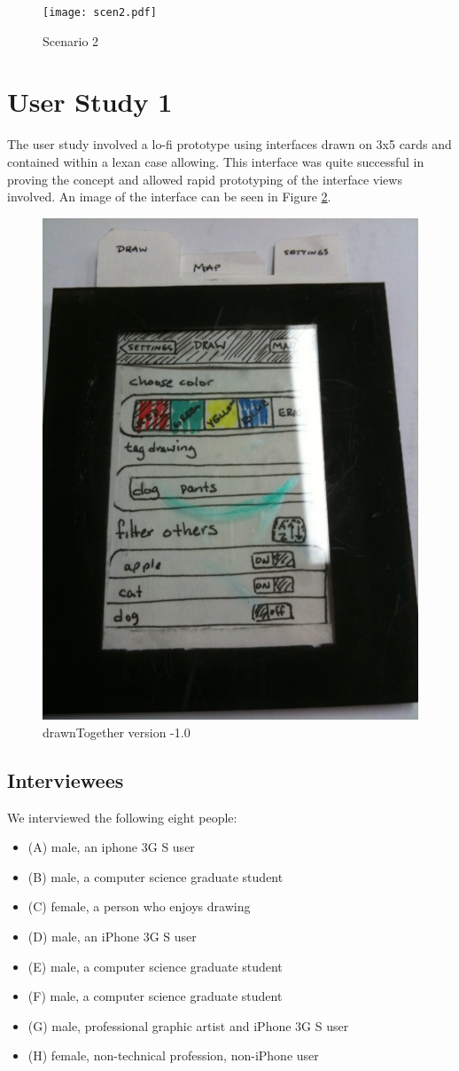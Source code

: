 \documentclass{chi2009}
\begin{document}
\begin{figure}
\centering
\texttt{[image: scen2.pdf]}
\caption{Scenario 2} \label{fig:s2}
\end{figure}

\section{User Study 1}
The user study involved a lo-fi prototype using interfaces drawn
on 3x5 cards and contained within a lexan case allowing.  This interface was
quite successful in proving the concept and allowed rapid prototyping of the
interface views involved.  An image of the interface can be seen in Figure
\ref{fig:plastic}.

\begin{figure}
\centering
\includegraphics[width=.40\textwidth]{plastic.pdf}
\caption{drawnTogether version -1.0} \label{fig:plastic}
\end{figure}

\subsection{Interviewees}
We interviewed the following eight people:

\begin{itemize}
\item (A) male, an iphone 3G S user
\item (B) male, a computer science graduate student
\item (C) female, a person who enjoys drawing
\item (D) male, an iPhone 3G S user
\item (E) male, a computer science graduate student
\item (F) male, a computer science graduate student
\item (G) male, professional graphic artist and iPhone 3G S user
\item (H) female, non-technical profession, non-iPhone user
\end{itemize}
\end{document}
